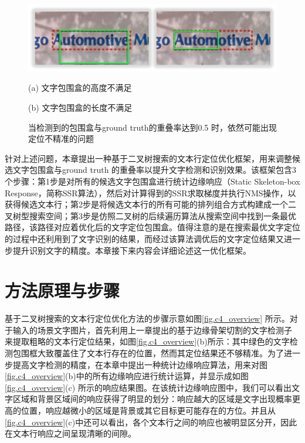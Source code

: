     \begin{figure}[!h]
    \centering
    \includegraphics[width=\textwidth]{./figures/c4_overlap.jpg}
    \begin{minipage}[t]{0.48\linewidth}
    \centerline{ \small (a) 文字包围盒的高度不满足}
    \end{minipage}
    \begin{minipage}[t]{0.48\linewidth}
    \centerline{ \small (b) 文字包围盒的长度不满足}
    \end{minipage}
    \caption{当检测到的包围盒与ground truth的重叠率达到0.5 时，依然可能出现定位不精准的问题}
    \label{fig.c4_overlap}
    \end{figure}

    针对上述问题，本章提出一种基于二叉树搜索的文本行定位优化框架，用来调整候选文字包围盒与ground truth 的重叠率以提升文字检测和识别效果。该框架包含3个步骤：第1步是对所有的候选文字包围盒进行统计边缘响应（Static Skeleton-box Response，简称SSR算法），然后对计算得到的SSR求取梯度并执行NMS操作，以获得候选文本行；第2步是将候选文本行的所有可能的排列组合方式构建成一个二叉树型搜索空间；第3步是仿照二叉树的后续遍历算法从搜索空间中找到一条最优路径，该路径对应着优化后的文字定位包围盒。值得注意的是在搜索最优文字定位的过程中还利用到了文字识别的结果，而经过该算法调优后的文字定位结果又进一步提升识别文字的精度。本章接下来内容会详细论述这一优化框架。

    \section{方法原理与步骤}

    基于二叉树搜索的文本行定位优化方法的步骤示意如图\ref{fig.c4_overview} 所示。对于输入的场景文字图片，首先利用上一章提出的基于边缘骨架切割的文字检测子\cite{He2017scene} 来提取粗略的文本行定位结果，如图\ref{fig.c4_overview}(b)所示：其中绿色的文字检测包围框大致覆盖住了文本行存在的位置，然而其定位结果还不够精准。为了进一步提高文字检测的精度，在本章中提出一种统计边缘响应算法，用来对图\ref{fig.c4_overview}(b)中的所有边缘响应进行统计运算，并显示成如图\ref{fig.c4_overview}(c) 所示的响应结果图。在该统计边缘响应图中，我们可以看出文字区域和背景区域间的响应获得了明显的划分：响应越大的区域是文字出现概率更高的位置，响应越微小的区域是背景或其它目标更可能存在的方位。并且从\ref{fig.c4_overview}(c)中还可以看出，各个文本行之间的响应也被明显区分开，因此在文本行响应之间呈现清晰的间隙。

